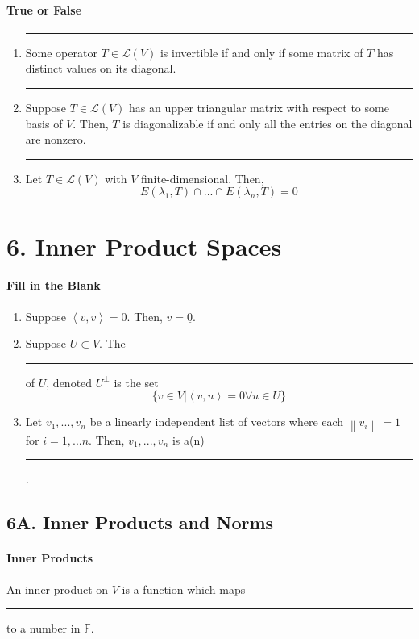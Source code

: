 \documentclass{article}
\newcommand{\norm}[1]{\left\lVert#1\right\rVert}
\newcommand{\iprod}[2]{\left\langle#1,#2\right\rangle}
\newcommand{\blank}[1]{\rule[0ex]{#1in}{0.5pt}}
\begin{document}
\paragraph{True or False}
\begin{enumerate}
    \item \blank{0.5} Some operator $T \in \mathcal{L}(V)$ is invertible if and only if some matrix of $T$ has distinct values on its diagonal.
    
    \item \blank{0.5} Suppose $T \in \mathcal{L}(V)$ has an upper triangular matrix with respect to some basis of $V$. Then, $T$ is diagonalizable if and only all the entries on the diagonal are nonzero.
    
    \item \blank{0.5} Let $T \in \mathcal{L}(V)$ with $V$ finite-dimensional. Then, 
    \[ E(\lambda_1, T) \cap ... \cap E(\lambda_n,T) = 0 \]
    
\end{enumerate}

\section*{6. Inner Product Spaces}
\paragraph{Fill in the Blank}
\begin{enumerate}
    \item Suppose $\iprod{v}{v} = 0$. Then, $v = \underline{0}$.
    \item Suppose $U \subset V$. The \blank{1} of $U$, denoted $U^\perp$ is the set
    \[ \{ v \in V | \iprod{v}{u} = 0 \forall u \in U \} \]
    \item Let $v_1, ..., v_n$ be a linearly independent list of vectors where each $\norm{v_i} = 1$ for $i = 1, ... n$. Then, $v_1, ..., v_n$ is a(n) \blank{2}.
\end{enumerate}

\subsection*{6A. Inner Products and Norms}
\paragraph{Inner Products} An inner product on $V$ is a function which maps \blank{2} to a number in $\mathbb{F}$.
\end{document}
